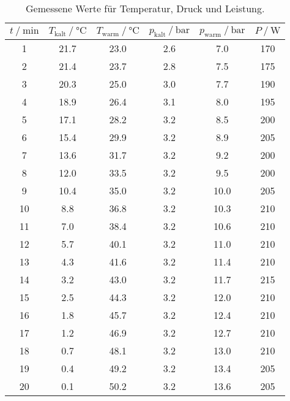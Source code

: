 \begin{table}
  \centering
  \caption{Gemessene Werte für Temperatur, Druck und Leistung.}
  \label{tab:Mess1}
  \begin{tabular}{S[table-format=2] S[table-format=2.1] S S[table-format=1.1] S S[table-format=3]}
      \toprule
      {$t \mathbin{/} \text{min}$} & {$T_{\text{kalt}} \mathbin{/} \unit{\degreeCelsius}$} &%
      {$T_{\text{warm}} \mathbin{/} \unit{\degreeCelsius}$} & {$p_{\text{kalt}} \mathbin{/} \unit{\bar}$} &%
      {$p_{\text{warm}} \mathbin{/} \unit{\bar}$} & {$P \mathbin{/} \unit{\watt}$} \\
       & 21.7 & 23.0 & 2.6 &  7.0 & 170 \\
       2 & 21.4 & 23.7 & 2.8 &  7.5 & 175 \\
       3 & 20.3 & 25.0 & 3.0 &  7.7 & 190 \\
       4 & 18.9 & 26.4 & 3.1 &  8.0 & 195 \\
       5 & 17.1 & 28.2 & 3.2 &  8.5 & 200 \\
       6 & 15.4 & 29.9 & 3.2 &  8.9 & 205 \\
       7 & 13.6 & 31.7 & 3.2 &  9.2 & 200 \\
       8 & 12.0 & 33.5 & 3.2 &  9.5 & 200 \\
       9 & 10.4 & 35.0 & 3.2 & 10.0 & 205 \\
      10 &  8.8 & 36.8 & 3.2 & 10.3 & 210 \\
      11 &  7.0 & 38.4 & 3.2 & 10.6 & 210 \\
      12 &  5.7 & 40.1 & 3.2 & 11.0 & 210 \\
      13 &  4.3 & 41.6 & 3.2 & 11.4 & 210 \\
      14 &  3.2 & 43.0 & 3.2 & 11.7 & 215 \\
      15 &  2.5 & 44.3 & 3.2 & 12.0 & 210 \\
      16 &  1.8 & 45.7 & 3.2 & 12.4 & 210 \\
      17 &  1.2 & 46.9 & 3.2 & 12.7 & 210 \\
      18 &  0.7 & 48.1 & 3.2 & 13.0 & 210 \\
      19 &  0.4 & 49.2 & 3.2 & 13.4 & 205 \\
      20 &  0.1 & 50.2 & 3.2 & 13.6 & 205 \\
      \bottomrule
      \end{tabular}
  \end{table}

